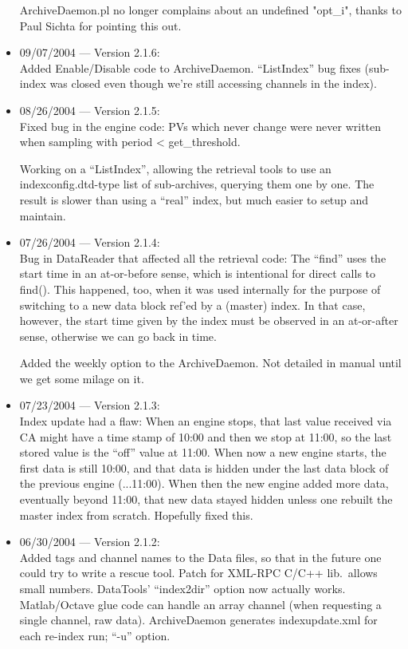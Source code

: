 \begin{itemize}
ArchiveDaemon.pl no longer complains about an undefined "opt\_i",
thanks to Paul Sichta for pointing this out.

\item 09/07/2004 --- Version 2.1.6:\\
Added Enable/Disable code to ArchiveDaemon.
``ListIndex'' bug fixes (sub-index was
closed even though we're still accessing channels in the index).

\item 08/26/2004 --- Version 2.1.5:\\
Fixed bug in the engine code: PVs which never change
were never written when sampling with period < get\_threshold.

Working on a ``ListIndex'', allowing the retrieval
tools to use an indexconfig.dtd-type list of
sub-archives, querying them one by one.
The result is slower than using a ``real'' index,
but much easier to setup and maintain.

\item 07/26/2004 --- Version 2.1.4:\\
Bug in DataReader that affected all the retrieval code:
The ``find'' uses the start time in an at-or-before sense,
which is intentional for direct calls to find().
This happened, too, when it was used internally for the purpose
of switching to a new data block ref'ed by a (master) index.
In that case, however, the start time given by the index must
be observed in an at-or-after sense, otherwise we can go
back in time.

Added the weekly option to the ArchiveDaemon.
Not detailed in manual until we get some milage on it.

\item 07/23/2004 --- Version 2.1.3:\\
Index update had a flaw:
When an engine stops, that last value received via CA
might have a time stamp of 10:00 and then we stop
at 11:00, so the last stored value is the ``off'' value
at 11:00.
When now a new engine starts, the first data is still
10:00, and that data is hidden under the last data block
of the previous engine (...11:00).
When then the new engine added more data, eventually
beyond 11:00, that new data stayed hidden unless
one rebuilt the master index from scratch.
Hopefully fixed this.

\item 06/30/2004 --- Version 2.1.2:\\
Added tags and channel names to the Data files,
so that in the future one could try to write
a rescue tool.
Patch for XML-RPC C/C++ lib.\ allows small numbers.
DataTools' ``index2dir'' option now actually works.
Matlab/Octave glue code can handle an array channel
(when requesting a single channel, raw data).
ArchiveDaemon generates indexupdate.xml for each re-index run;
``-u'' option.


\end{itemize}
